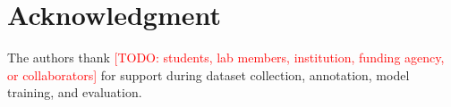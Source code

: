 \documentclass[journal]{IEEEtran}
\newcommand{\todo}[1]{\textcolor{red}{[TODO: #1]}}
\begin{document}
\section*{Acknowledgment}
The authors thank \todo{students, lab members, institution, funding agency, or collaborators} for support during dataset collection, annotation, model training, and evaluation.




\balance
\end{document}
